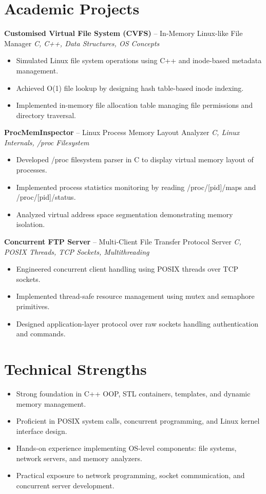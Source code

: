 \documentclass[10.5pt,a4paper]{article}
\begin{document}
\section{Academic Projects}
\textbf{Customised Virtual File System (CVFS)} -- In-Memory Linux-like File Manager \hfill \textit{C, C++, Data Structures, OS Concepts}
\begin{itemize}
  \item Simulated Linux file system operations using C++ and inode-based metadata management.
  \item Achieved O(1) file lookup by designing hash table-based inode indexing.
  \item Implemented in-memory file allocation table managing file permissions and directory traversal.
\end{itemize}
\vspace{4pt}
\textbf{ProcMemInspector} -- Linux Process Memory Layout Analyzer \hfill \textit{C, Linux Internals, /proc Filesystem}
\begin{itemize}
  \item Developed /proc filesystem parser in C to display virtual memory layout of processes.
  \item Implemented process statistics monitoring by reading /proc/[pid]/maps and /proc/[pid]/status.
  \item Analyzed virtual address space segmentation demonstrating memory isolation.
\end{itemize}
\vspace{4pt}
\textbf{Concurrent FTP Server} -- Multi-Client File Transfer Protocol Server \hfill \textit{C, POSIX Threads, TCP Sockets, Multithreading}
\begin{itemize}
  \item Engineered concurrent client handling using POSIX threads over TCP sockets.
  \item Implemented thread-safe resource management using mutex and semaphore primitives.
  \item Designed application-layer protocol over raw sockets handling authentication and commands.
\end{itemize}
\section{Technical Strengths}
\begin{itemize}
  \item Strong foundation in C++ OOP, STL containers, templates, and dynamic memory management.
  \item Proficient in POSIX system calls, concurrent programming, and Linux kernel interface design.
  \item Hands-on experience implementing OS-level components: file systems, network servers, and memory analyzers.
  \item Practical exposure to network programming, socket communication, and concurrent server development.
\end{itemize}
\end{document}
